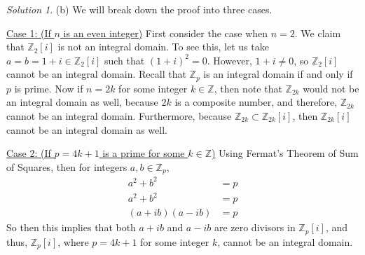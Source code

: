 \documentclass[11pt]{amsart}
\theoremstyle{definition}\newtheorem{question}{Question}
\theoremstyle{definition}\newtheorem{claim}{Claim}
\theoremstyle{remark}\newtheorem*{solution}{Solution}
\newcommand{\Z}{\mathbb{Z}}
\begin{document}
\begin{solution}
    (b) We will break down the proof into three cases.

    \underline{Case 1: (If $n$ is an even integer)} First consider the case when $n = 2$. We claim that $\Z_2[i]$ is not an integral domain. To see this, let us take $a = b = 1 + i \in \Z_2[i]$ such that $(1 + i)^2 = 0$. However, $1 + i \neq 0$, so $\Z_2[i]$ cannot be an integral domain. Recall that $\Z_p$ is an integral domain if and only if $p$ is prime. Now if $n = 2k$ for some integer $k \in \Z$, then note that $\Z_{2k}$ would not be an integral domain as well, because $2k$ is a composite number, and therefore, $\Z_{2k}$ cannot be an integral domain. Furthermore, because $\Z_{2k} \subset \Z_{2k}[i]$, then $\Z_{2k}[i]$ cannot be an integral domain as well.

    \underline{Case 2: (If $p = 4k + 1$ is a prime for some $k \in \Z$)} Using Fermat's Theorem of Sum of Squares, then for integers $a, b \in \Z_p$,
    \begin{align*}
        a^2 + b^2 &= p \\
        a^2 + b^2 &= p \\
        (a + ib)(a - ib) &= p
    \end{align*}
    So then this implies that both $a + ib$ and $a - ib$ are zero divisors in $\Z_p[i]$, and thus, $\Z_p[i]$, where $p = 4k + 1$ for some integer $k$, cannot be an integral domain.


\end{solution}
\end{document}
